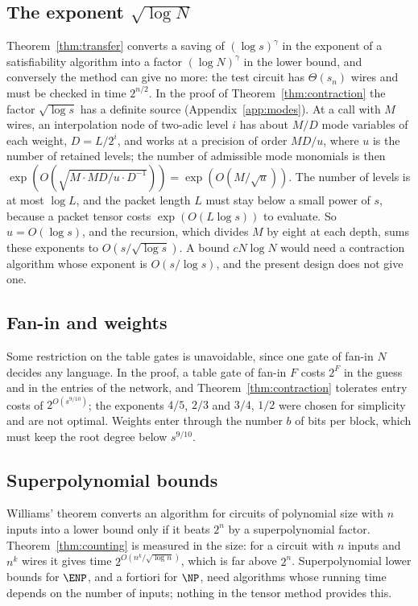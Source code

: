 \subsection{The exponent $\sqrt{\log N}$}
Theorem~\ref{thm:transfer} converts a saving of $(\log s)^\gamma$ in the exponent
of a satisfiability algorithm into a factor $(\log N)^\gamma$ in the lower bound,
and conversely the method can give no more: the test circuit has $\Theta(s_n)$
wires and must be checked in time $2^{n/2}$. In the proof of
Theorem~\ref{thm:contraction} the factor $\sqrt{\log s}$ has a definite source
(Appendix~\ref{app:modes}). At a call with $M$ wires, an interpolation node of
two-adic level $i$ has about $M/D$ mode variables of each weight, $D=L/2^i$,
and works at a precision of order $MD/u$, where $u$ is the number of retained
levels; the number of admissible mode monomials is then
$\exp(O(\sqrt{M\cdot MD/u\cdot D^{-1}}))=\exp(O(M/\sqrt u))$. The number of
levels is at most $\log L$, and the packet length $L$ must stay below a small
power of $s$, because a packet tensor costs $\exp(O(L\log s))$ to evaluate.
So $u=O(\log s)$, and the recursion, which divides $M$ by eight at each depth,
sums these exponents to $O(s/\sqrt{\log s})$. A bound $cN\log N$ would need a contraction algorithm
whose exponent is $O(s/\log s)$, and the present design does not give one.

\subsection{Fan-in and weights}
Some restriction on the table gates is unavoidable, since one gate of fan-in
$N$ decides any language. In the proof, a table gate of fan-in $F$ costs $2^F$ in
the guess and in the entries of the network, and Theorem~\ref{thm:contraction}
tolerates entry costs of $2^{O(s^{9/10})}$; the exponents $4/5$, $2/3$ and $3/4$,
$1/2$ were chosen for simplicity and are not optimal. Weights enter through the
number $b$ of bits per block, which must keep the root degree below $s^{9/10}$.

\subsection{Superpolynomial bounds}
Williams' theorem \cite{Wil13} converts an algorithm for circuits of polynomial
size with $n$ inputs into a lower bound only if it beats $2^n$ by a
superpolynomial factor. Theorem~\ref{thm:counting} is measured in the size: for
a circuit with $n$ inputs and $n^k$ wires it gives time $2^{O(n^k/\sqrt{\log
n})}$, which is far above $2^n$. Superpolynomial lower bounds for $\ENP$, and a
fortiori for $\NP$, need algorithms whose running time depends on the number of
inputs; nothing in the tensor method provides this.

